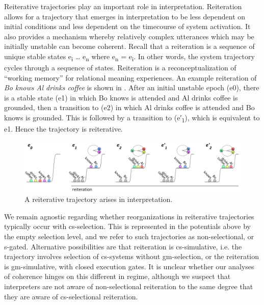   Reiterative trajectories play an important role in interpretation. Reiteration allows for a trajectory that emerges in interpretation to be less dependent on initial conditions and less dependent on the timecourse of system activation. It also provides a mechanism whereby relatively complex utterances which may be initially unstable can become coherent. Recall that a reiteration is a sequence of unique stable states e\textsubscript{i} … e\textsubscript{n} where e\textsubscript{n} = e\textsubscript{i}. In other words, the system trajectory cycles through a sequence of states. Reiteration is a reconceptualization of “working memory” for relational meaning experiences. An example reiteration of \textit{Bo knows Al drinks coffee} is shown in {}. After an initial unstable epoch (e0), there is a stable state (e1) in which {\textbar}Bo knows{\textbar} is attended and {\textbar}Al drinks coffee{\textbar} is grounded, then a transition to (e2) in which {\textbar}Al drinks coffee{\textbar} is attended and {\textbar}Bo knows{\textbar} is grounded. This is followed by a transition to (e′\textsubscript{1}), which is equivalent to e1. Hence the trajectory is reiterative.

  
\begin{figure}
\includegraphics[width=\textwidth]{figures/Tilsen-img122.png}
\caption{A reiterative trajectory arises in interpretation.}
\label{fig:6:3}
\end{figure}
 

  We remain agnostic regarding whether reorganizations in reiterative trajectories typically occur with cs-selection. This is represented in the potentials above by the empty selection level, and we refer to such trajectories as non-selectional, or s-gated. Alternative possibilities are that reiteration is cs-simulative, i.e. the trajectory involves selection of cs-systems without gm-selection, or the reiteration is gm-simulative, with closed execution gates. It is unclear whether our analyses of coherence hinges on this different in regime, although we suspect that interpreters are not aware of non-selectional reiteration to the same degree that they are aware of cs-selectional reiteration.  


